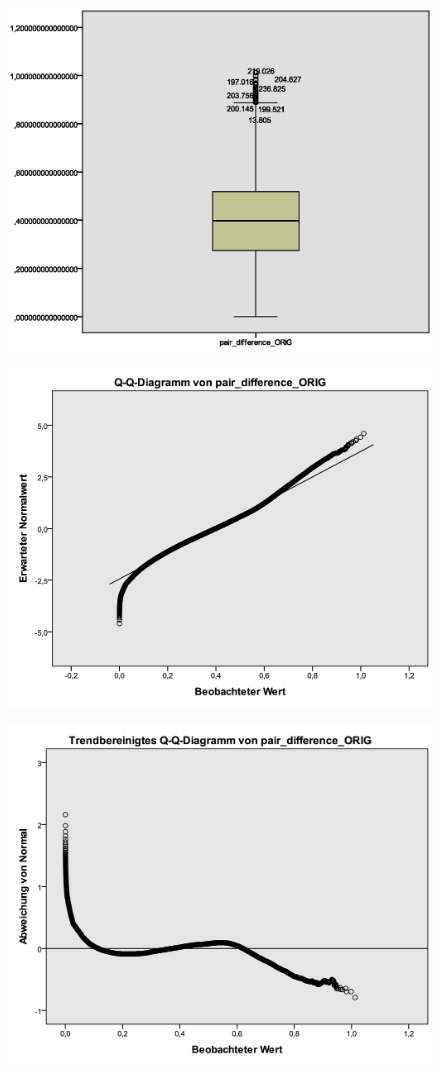 \documentclass[]{report}
\begin{document}
\begin{figure}[htb]
	\includegraphics[width=\textwidth]{images/pair_difference_boxplot.eps}
\end{figure}

\begin{figure}[htb]
	\includegraphics[width=\textwidth]{images/pair_difference_orig_qq.png}
\end{figure}

\begin{figure}[htb]
	\includegraphics[width=\textwidth]{images/pair_difference_orig_qq_cleaned.png}
\end{figure}
\end{document}
